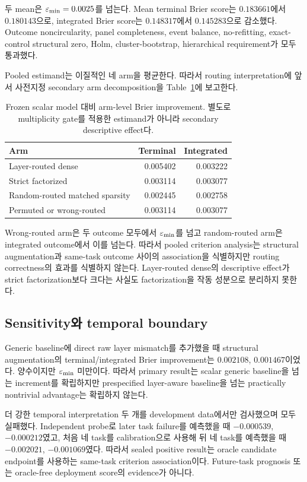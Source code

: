 두 mean은 \(\varepsilon_{\mathrm{min}}=0.0025\)를 넘는다. Mean terminal Brier score는
\(0.183661\)에서 \(0.180143\)으로, integrated Brier score는 \(0.148317\)에서
\(0.145283\)으로 감소했다. Outcome noncircularity, panel completeness, event
balance, no-refitting, exact-control structural zero, Holm,
cluster-bootstrap, hierarchical requirement가 모두 통과했다.

Pooled estimand는 이질적인 네 arm을 평균한다. 따라서 routing interpretation에
앞서 사전지정 secondary arm decomposition을
Table~\ref{tab:validity-arms}에 보고한다.

\begin{table}[ht]
\centering
\caption{Frozen scalar model 대비 arm-level Brier improvement. 별도로
multiplicity gate를 적용한 estimand가 아니라 secondary descriptive effect다.}
\label{tab:validity-arms}
\begin{tabular}{lrr}
\toprule
Arm & Terminal & Integrated \\
\midrule
Layer-routed dense & 0.005402 & 0.003222 \\
Strict factorized & 0.003114 & 0.003077 \\
Random-routed matched sparsity & 0.002445 & 0.002758 \\
Permuted or wrong-routed & 0.003114 & 0.003077 \\
\bottomrule
\end{tabular}
\end{table}

Wrong-routed arm은 두 outcome 모두에서 \(\varepsilon_{\mathrm{min}}\)를 넘고 random-routed arm은
integrated outcome에서 이를 넘는다. 따라서 pooled criterion analysis는
structural augmentation과 same-task outcome 사이의 association을 식별하지만
routing correctness의 효과를 식별하지 않는다. Layer-routed dense의 descriptive
effect가 strict factorization보다 크다는 사실도 factorization을 작동 성분으로
분리하지 못한다.

\subsection{Sensitivity와 temporal boundary}

Generic baseline에 direct raw layer mismatch를 추가했을 때 structural
augmentation의 terminal/integrated Brier improvement는 \(0.002108\),
\(0.001467\)이었다. 양수이지만 \(\varepsilon_{\mathrm{min}}\) 미만이다. 따라서 primary result는
scalar generic baseline을 넘는 increment를 확립하지만 prespecified
layer-aware baseline을 넘는 practically nontrivial advantage는 확립하지
않는다.

더 강한 temporal interpretation 두 개를 development data에서만 검사했으며
모두 실패했다. Independent probe로 later task failure를 예측했을 때
\(-0.000539\), \(-0.000212\)였고, 처음 네 task를 calibration으로 사용해 뒤
네 task를 예측했을 때 \(-0.002021\), \(-0.001069\)였다. 따라서 sealed
positive result는 oracle candidate endpoint를 사용하는 same-task criterion
association이다. Future-task prognosis 또는 oracle-free deployment score의
evidence가 아니다.
